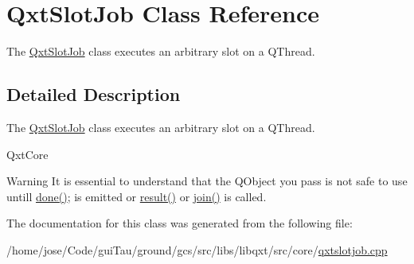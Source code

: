 \hypertarget{class_qxt_slot_job}{\section{Qxt\-Slot\-Job Class Reference}
\label{class_qxt_slot_job}
}


The \hyperlink{class_qxt_slot_job}{Qxt\-Slot\-Job} class executes an arbitrary slot on a Q\-Thread.  




\subsection{Detailed Description}
The \hyperlink{class_qxt_slot_job}{Qxt\-Slot\-Job} class executes an arbitrary slot on a Q\-Thread. 

Qxt\-Core

\begin{DoxyWarning}{Warning}
It is essential to understand that the Q\-Object you pass is not safe to use untill \hyperlink{qxtjob_8h_ab650651e4cda2869f73100c6fd2c821a}{done()}; is emitted or \hyperlink{qxtslotjob_8h_aab161efab0511ea9612b64c40e9852ca}{result()} or \hyperlink{qxtjob_8h_aa66a6b989a32d13393dbd904b885cc3a}{join()} is called. 
\end{DoxyWarning}


The documentation for this class was generated from the following file\-:\begin{DoxyCompactItemize}
\item 
/home/jose/\-Code/gui\-Tau/ground/gcs/src/libs/libqxt/src/core/\hyperlink{qxtslotjob_8cpp}{qxtslotjob.\-cpp}\end{DoxyCompactItemize}
